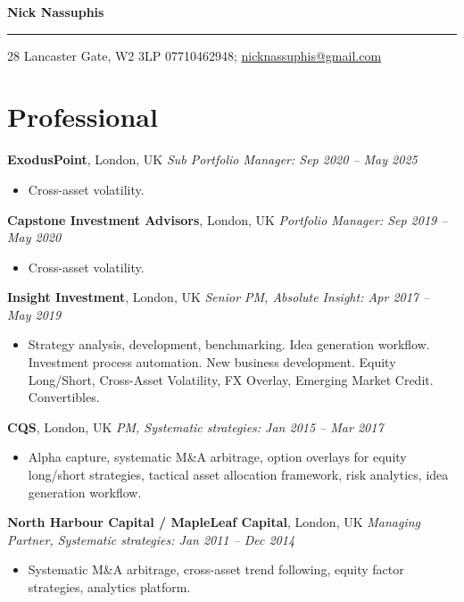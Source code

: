 \documentclass[11pt,oneside]{article}\usepackage[]{graphicx}\usepackage[]{xcolor}
\begin{document}
{\LARGE \textbf{Nick Nassuphis}}\par
\rule{\textwidth}{0.5pt}

\small 28 Lancaster Gate, W2 3LP \hfill 07710462948; \href{mailto:nicknassuphis@gmail.com}{nicknassuphis@gmail.com}
\normalsize

\vspace{10pt}

\section*{Professional}

\textbf{ExodusPoint}, London, UK \hfill \emph{Sub Portfolio Manager: Sep 2020 -- May 2025}\par
\begin{itemize}
  \item Cross-asset volatility.
\end{itemize}

\textbf{Capstone Investment Advisors}, London, UK \hfill \emph{Portfolio Manager: Sep 2019 -- May 2020}\par
\begin{itemize}
  \item Cross-asset volatility.
\end{itemize}

\textbf{Insight Investment}, London, UK \hfill \emph{Senior PM, Absolute Insight: Apr 2017 -- May 2019}\par
\begin{itemize}
  \item Strategy analysis, development, benchmarking. Idea generation workflow. Investment process automation.
  New business development. Equity Long/Short, Cross-Asset Volatility, FX Overlay, Emerging Market Credit. Convertibles.
\end{itemize}

\textbf{CQS}, London, UK \hfill \emph{PM, Systematic strategies: Jan 2015 -- Mar 2017}\par
\begin{itemize}
  \item Alpha capture, systematic M\&A arbitrage, option overlays for equity long/short strategies,
  tactical asset allocation framework, risk analytics, idea generation workflow.
\end{itemize}

\textbf{North Harbour Capital / MapleLeaf Capital}, London, UK \hfill \emph{Managing Partner, Systematic strategies: Jan 2011 -- Dec 2014}\par
\begin{itemize}
  \item Systematic M\&A arbitrage, cross-asset trend following, equity factor strategies, analytics platform.
\end{itemize}
\end{document}
